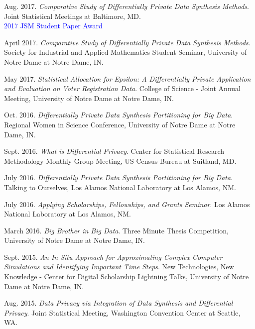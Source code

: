\documentclass[11pt, letterpaper, roman]{moderncv} %
\begin{document}
\begin{etaremune}[topsep=0pt, itemsep=0.75pt, partopsep=0pt, parsep=0pt]
    \item Aug. 2017. \textit{Comparative Study of Differentially Private Data Synthesis Methods}. Joint Statistical Meetings at Baltimore, MD.\\
    \textcolor{blue}{2017 JSM Student Paper Award}
    
    \item April 2017. \textit{Comparative Study of Differentially Private Data Synthesis Methods}. Society for Industrial and Applied Mathematics Student Seminar, University of Notre Dame at Notre Dame, IN.
    
    \item May 2017. \textit{Statistical Allocation for Epsilon: A Differentially Private Application and Evaluation on Voter Registration Data}. College of Science - Joint Annual Meeting, University of Notre Dame at Notre Dame, IN.
    
    \item Oct. 2016. \textit{Differentially Private Data Synthesis Partitioning for Big Data}. Regional Women in Science Conference, University of Notre Dame at Notre Dame, IN. 
    
    \item Sept. 2016. \textit{What is Differential Privacy}. Center for Statistical Research Methodology Monthly Group Meeting, US Census Bureau at Suitland, MD. 
    
    \item July 2016. \textit{Differentially Private Data Synthesis Partitioning for Big Data}. Talking to Ourselves, Los Alamos National Laboratory at Los Alamos, NM.
    
    \item July 2016. \textit{Applying Scholarships, Fellowships, and Grants Seminar}. Los Alamos National Laboratory at Los Alamos, NM.
    
    \item March 2016. \textit{Big Brother in Big Data}. Three Minute Thesis Competition, University of Notre Dame at Notre Dame, IN.
    
    \item Sept. 2015. \textit{An In Situ Approach for Approximating Complex Computer Simulations and Identifying Important Time Steps}. New Technologies, New Knowledge - Center for Digital Scholarship Lightning Talks, University of Notre Dame at Notre Dame, IN.
    
    \item Aug. 2015. \textit{Data Privacy via Integration of Data Synthesis and Differential Privacy}. Joint Statistical Meeting, Washington Convention Center at Seattle, WA.
    

\end{etaremune}
\end{document}
